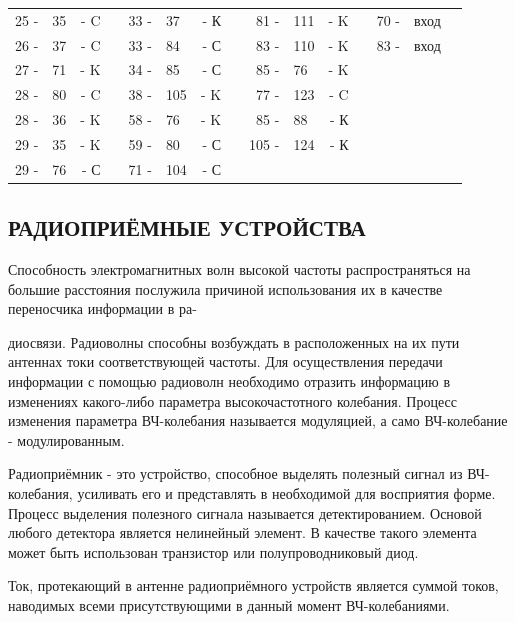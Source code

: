 \documentclass[12pt]{article}
\begin{document}
\hrulefill

\begin{tabular}{r l r p{0.5cm} r l r p{0.5cm} r l r p{0.5cm} r l r}
25 - & 35  & - C &   & 33 - & 37  & - К &    &  81 - & 111 & - K &   &  70 - & вход & \\
26 - & 37  & - C &   & 33 - & 84  & - С &    &  83 - & 110 & - K &   &  83 - & вход & \\
27 - & 71  & - K &   & 34 - & 85  & - С &    &  85 - & 76  & - K &   &       &      & \\
28 - & 80  & - C &   & 38 - & 105 & - K &    &  77 - & 123 & - C &   &       &      & \\
28 - & 36  & - K &   & 58 - & 76  & - K &    &  85 - & 88  & - К &   &       &      & \\
29 - & 35  & - K &   & 59 - & 80  & - С &    & 105 - & 124 & - К &   &       &      & \\
29 - & 76  & - С &   & 71 - & 104 & - С &    &       &     &     &   &       &      & \\
\end{tabular}

\hrulefill

\subsection{ РАДИОПРИЁМНЫЕ УСТРОЙСТВА}

Способность электромагнитных волн высокой частоты распространяться на большие расстояния послужила причиной использования их в качестве переносчика информации в ра-

\newpage

диосвязи. Радиоволны способны возбуждать в расположенных на их пути антеннах токи соответствующей частоты. Для осуществления передачи информации с помощью радиоволн необходимо отразить информацию в изменениях какого-либо параметра высокочастотного колебания. Процесс изменения параметра ВЧ-колебания называется модуляцией, а само ВЧ-колебание - модулированным.

Радиоприёмник - это устройство, способное выделять полезный сигнал из ВЧ-колебания, усиливать его и представлять в необходимой для восприятия форме. Процесс выделения полезного сигнала называется детектированием. Основой любого детектора является нелинейный элемент. В качестве такого элемента может быть использован транзистор или полупроводниковый диод.

Ток, протекающий в антенне радиоприёмного устройств является суммой токов, наводимых всеми присутствующими в данный момент ВЧ-колебаниями.
\end{document}
